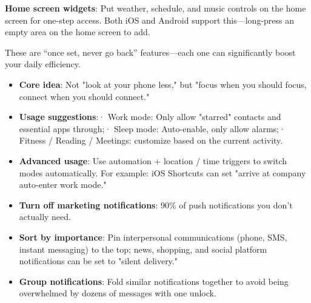 \textbf{Home screen widgets}: Put weather, schedule, and music controls on the home screen for one-step access. Both iOS and Android support this—long-press an empty area on the home screen to add.


These are “once set, never go back” features—each one can significantly boost your daily efficiency.


\begin{itemize}
  \item \textbf{Core idea}: Not "look at your phone less," but "focus when you should focus, connect when you should connect."
  \item \textbf{Usage suggestions}:\newline · Work mode: Only allow "starred" contacts and essential apps through;\newline · Sleep mode: Auto-enable, only allow alarms;\newline · Fitness / Reading / Meetings: customize based on the current activity.
  \item \textbf{Advanced usage}: Use automation + location / time triggers to switch modes automatically. For example: iOS Shortcuts can set "arrive at company auto-enter work mode."
\end{itemize}


\begin{itemize}
  \item \textbf{Turn off marketing notifications}: 90\% of push notifications you don't actually need.
  \item \textbf{Sort by importance}: Pin interpersonal communications (phone, SMS, instant messaging) to the top; news, shopping, and social platform notifications can be set to "silent delivery."
  \item \textbf{Group notifications}: Fold similar notifications together to avoid being overwhelmed by dozens of messages with one unlock.
\end{itemize}


